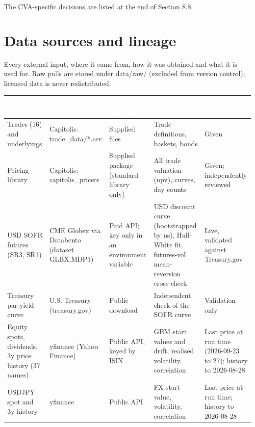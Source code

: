 \documentclass[11pt,letterpaper]{article}
\begin{document}
The CVA-specific decisions are listed at the end of Section 8.8.

\clearpage
\section{Data sources and lineage}
Every external input, where it came from, how it was obtained and what it is used for. Raw pulls are stored under data/raw/ (excluded from version control); licensed data is never redistributed.

{\scriptsize\setlength{\LTpre}{4pt}\setlength{\LTpost}{6pt}
\begin{longtable}{>{\raggedright\arraybackslash}p{}>{\raggedright\arraybackslash}p{}>{\raggedright\arraybackslash}p{}>{\raggedright\arraybackslash}p{}>{\raggedright\arraybackslash}p{}}
\toprule
\rowcolor{navy}\textbf{\textcolor{white}{Input}} & \textbf{\textcolor{white}{Source}} & \textbf{\textcolor{white}{How obtained}} & \textbf{\textcolor{white}{Used for}} & \textbf{\textcolor{white}{Status}} \\
\endhead
Trades (16) and underlyings & Capitolis: trade\_data/*.csv & Supplied files & Trade definitions, baskets, bonds & Given \\
\rowcolor{gray!9}Pricing library & Capitolis: capitolis\_pricers & Supplied package (standard library only) & All trade valuation (npv), curves, day counts & Given; independently reviewed \\
USD SOFR futures (SR3, SR1) & CME Globex via Databento (dataset GLBX.MDP3) & Paid API; key only in an environment variable & USD discount curve (bootstrapped by us), Hull-White fit, futures-vol mean-reversion cross-check & Live, validated against Treasury.gov \\
\rowcolor{gray!9}Treasury par yield curve & U.S. Treasury (treasury.gov) & Public download & Independent check of the SOFR curve & Validation only \\
Equity spots, dividends, 3y price history (37 names) & yfinance (Yahoo Finance) & Public API, keyed by ISIN & GBM start values and drift, realised volatility, correlation & Last price at run time (2026-09-23 to 27); history to 2026-08-28 \\
\rowcolor{gray!9}USDJPY spot and 3y history & yfinance & Public API & FX start value, volatility, correlation & Last price at run time; history to 2026-08-28 \\

\end{longtable}}
\end{document}
